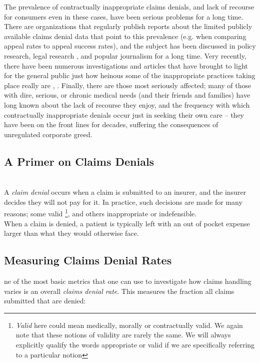 \documentclass[psamsfonts]{amsart}
\theoremstyle{plain}
\theoremstyle{definition}
\theoremstyle{remark}
\begin{document}
The prevalence of contractually inappropriate claims denials, and lack of recourse for consumers even in these cases, have been serious problems for a long time. There are organizations that regularly publish reports \cite{pollitz2021} about the limited publicly available claims denial data that point to this prevalence (e.g. when comparing appeal rates to appeal success rates), and the subject has been discussed in policy research, legal research \cite{fox2010}, and popular journalism \cite{konrad2010} for a long time. Very recently, there have been numerous investigations and articles that have brought to light for the general public just how heinous some of the inappropriate practices taking place really are \cite{armstrong2023a}, \cite{armstrong2023b}. Finally, there are those most seriously affected; many of those with dire, serious, or chronic medical needs (and their friends and families) have long known about the lack of recourse they enjoy, and the frequency with which contractually inappropriate denials occur just in seeking their own care -- they have been on the front lines for decades, suffering the consequences of unregulated corporate greed.\\
	
\subsection{A Primer on Claims Denials}
\hfill\\

\indent A \emph{claim denial} occurs when a claim is submitted to an insurer, and the insurer decides they will not pay for it. In practice, such decisions are made for many reasons; some valid \footnote{\emph{Valid} here could mean medically, morally or contractually valid. We again note that these notions of validity are rarely the same. We will always explicitly qualify the words appropriate or valid if we are specifically referring to a particular notion}, and others inappropriate or indefensible.\\

When a claim is denied, a patient is typically left with an out of pocket expense larger than what they would otherwise face.

\subsection{Measuring Claims Denial Rates}

ne of the most basic metrics that one can use to investigate how claims handling varies is an overall \emph{claims denial rate}. This measures the fraction all claims submitted that are denied:
\end{document}
